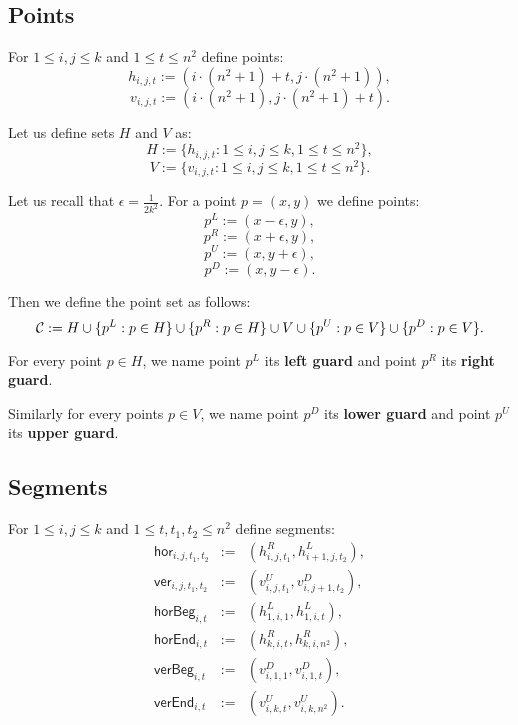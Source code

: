 \subsection{Points}

For $1 \le i,j \le k$ and $1 \le t \le n^2$ define points:
	$$h_{i, j, t} := (i \cdot (n^2+1) + t, j \cdot (n^2+1)),$$
	$$v_{i, j, t} := (i \cdot (n^2+1), j \cdot (n^2+1) + t).$$
	
Let us define sets $H$ and $V$ as:
$$H := \{h_{i, j, t} : 1 \le i, j \le k, 1 \le t \le n^2\},$$
$$V := \{v_{i, j, t} : 1 \le i, j \le k, 1 \le t \le n^2\}.$$
	
Let us recall that $\epsilon = \frac{1}{2k^2}$.
For a point $p = (x, y)$ we define points:
$$p^{L} := (x - \epsilon, y),$$
$$p^{R} := (x + \epsilon, y),$$
$$p^{U} := (x, y + \epsilon),$$
$$p^{D} := (x, y - \epsilon).$$

Then we define the point set as follows:
$$\mathcal{C} := H \cup \{p^L : p \in H\} \cup \{p^R : p \in H\}
\cup V \cup \{p^U : p \in V\} \cup \{p^D : p \in V\}.$$

\begin{defi}
	\label{guard_def}
	For every point $p \in H$, we name point $p^L$ its \textbf{left guard}
	and point $p^R$ its \textbf{right guard}.
	
	Similarly for every points $p \in V$, we name point $p^D$ its \textbf{lower guard}
	and point $p^U$ its \textbf{upper guard}.
\end{defi}

\subsection{Segments}
\newcommand{\hor}[4]{\mathsf{hor}_{#1,#2,#3,#4}}
\newcommand{\ver}[4]{\mathsf{ver}_{#1,#2,#3,#4}}
\newcommand{\horbeg}[2]{\mathsf{horBeg}_{#1,#2}}
\newcommand{\verbeg}[2]{\mathsf{verBeg}_{#1,#2}}
\newcommand{\horend}[2]{\mathsf{horEnd}_{#1,#2}}
\newcommand{\verend}[2]{\mathsf{verEnd}_{#1,#2}}

For $1 \le i,j \le k$ and $1 \le t, t_1, t_2 \le n^2$ define segments:
\begin{eqnarray*}
\hor{i}{j}{t_1}{t_2} & := & (h^R_{i,j,t_1}, h^L_{i+1, j, t_2}), \\
\ver{i}{j}{t_1}{t_2} & := & (v^U_{i,j,t_1}, v^D_{i, j+1, t_2}), \\
\horbeg{i}{t} & := & (h^L_{1, i, 1}, h^L_{1, i, t}), \\
\horend{i}{t} & := & (h^R_{k, i, t}, h^R_{k, i, n^2}), \\
\verbeg{i}{t} & := & (v^D_{i, 1, 1}, v^D_{i, 1, t}), \\
\verend{i}{t} & := & (v^U_{i, k, t}, v^U_{i, k, n^2}). \\
\end{eqnarray*}

